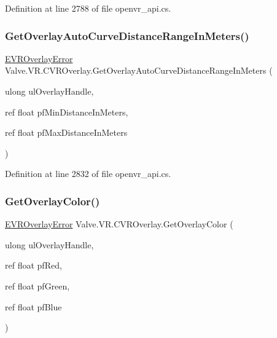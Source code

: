 Definition at line 2788 of file openvr\+\_\+api.\+cs.

\mbox{\label{class_valve_1_1_v_r_1_1_c_v_r_overlay_aaef888c61e319cf3be2bf0f8ddce969d}} 
\subsubsection{\texorpdfstring{GetOverlayAutoCurveDistanceRangeInMeters()}{GetOverlayAutoCurveDistanceRangeInMeters()}}
{\footnotesize\ttfamily \mbox{\hyperlink{namespace_valve_1_1_v_r_aaee5c5144f42b7969d45b854f51b0c18}{E\+V\+R\+Overlay\+Error}} Valve.\+V\+R.\+C\+V\+R\+Overlay.\+Get\+Overlay\+Auto\+Curve\+Distance\+Range\+In\+Meters (\begin{DoxyParamCaption}\item[{ulong}]{ul\+Overlay\+Handle,  }\item[{ref float}]{pf\+Min\+Distance\+In\+Meters,  }\item[{ref float}]{pf\+Max\+Distance\+In\+Meters }\end{DoxyParamCaption})}



Definition at line 2832 of file openvr\+\_\+api.\+cs.

\mbox{\label{class_valve_1_1_v_r_1_1_c_v_r_overlay_a862754bec837227cde72f59b18274054}} 
\subsubsection{\texorpdfstring{GetOverlayColor()}{GetOverlayColor()}}
{\footnotesize\ttfamily \mbox{\hyperlink{namespace_valve_1_1_v_r_aaee5c5144f42b7969d45b854f51b0c18}{E\+V\+R\+Overlay\+Error}} Valve.\+V\+R.\+C\+V\+R\+Overlay.\+Get\+Overlay\+Color (\begin{DoxyParamCaption}\item[{ulong}]{ul\+Overlay\+Handle,  }\item[{ref float}]{pf\+Red,  }\item[{ref float}]{pf\+Green,  }\item[{ref float}]{pf\+Blue }\end{DoxyParamCaption})}



